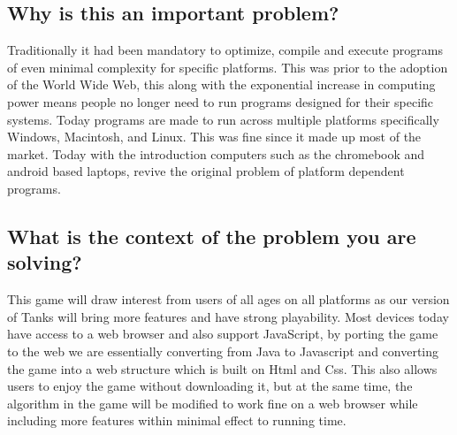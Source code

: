 \documentclass{article}
\begin{document}
\subsection{Why is this an important problem?}
Traditionally it had been mandatory to optimize, compile and execute programs of even
minimal complexity for specific platforms. This was prior to the adoption of the World Wide Web,
this along with the exponential increase in computing power means people no longer need to
run programs designed for their specific systems. Today programs are made to run across
multiple platforms specifically Windows, Macintosh, and Linux. This was fine since it made up
most of the market. Today with the introduction computers such as the chromebook and
android based laptops, revive the original problem of platform dependent programs.

\subsection{What is the context of the problem you are solving?}
This game will draw interest from users of all ages on all platforms as our version of
Tanks will bring more features and have strong playability. Most devices today have access to a
web browser and also support JavaScript, by porting the game to the web we are essentially
converting from Java to Javascript and converting the game into a web structure which is built
on Html and Css. This also allows users to enjoy the game without downloading it, but at the
same time, the algorithm in the game will be modified to work fine on a web browser while
including more features within minimal effect to running time.
\end{document}
